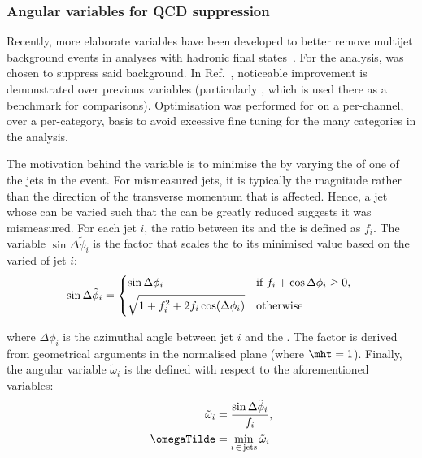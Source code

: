 

\subsubsection{Angular variables for QCD suppression}
\label{subsubsec:htoinv_ang_var_optimisation}

Recently, more elaborate variables have been developed to better remove multijet background events in analyses with hadronic final states~\cite{Sakuma:2018xrq}. For the analysis, \omegaTilde was chosen to suppress said background. In Ref.~, noticeable improvement is demonstrated over previous variables (particularly \biasedDPhi, which is used there as a benchmark for comparisons). Optimisation was performed for \omegaTilde on a per-channel, over a per-category, basis to avoid excessive fine tuning for the many categories in the analysis.

The motivation behind the variable \omegaTilde is to minimise the \mht by varying the \pt of one of the \glspl{jet} in the event. For mismeasured \glspl{jet}, it is typically the magnitude rather than the direction of the transverse momentum that is affected. Hence, a \gls{jet} whose \pt can be varied such that the \mht can be greatly reduced suggests it was mismeasured. For each jet $i$, the ratio between its \pt and the \mht is defined as $f_i$. The variable $\sin\Delta\tilde{\phi}_i$ is the factor that scales the \mht to its minimised value based on the varied \pt of jet $i$:
\begin{align}
\sin\Delta\tilde{\phi}_i = \begin{dcases*}
\sin\Delta\phi_i & if $f_i + \cos\Delta\phi_i \geq 0$, \\
\sqrt{1 + f_i^2 + 2 f_i \cos(\Delta\phi_i)} & otherwise\\
\end{dcases*}
\end{align}

where $\Delta\phi_i$ is the azimuthal angle between \gls{jet} $i$ and the \htvecmiss. The factor is derived from geometrical arguments in the normalised \pt plane (where $\mht = \text{1}$). Finally, the angular variable $\tilde{\omega}_i$ is the defined with respect to the aforementioned variables:
\begin{equation}
    \begin{aligned}
\tilde{\omega}_i &= \frac{ \sin\Delta\tilde{\phi}_i }{ f_i },\\
\omegaTilde &= \min_{i \, \in \, \mathrm{jets}} \tilde{\omega}_i
    \end{aligned}
\end{equation}


